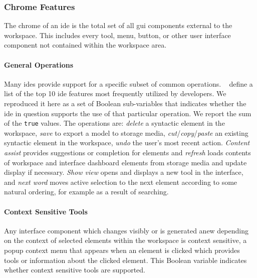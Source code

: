 \subsubsection{Chrome Features} \label{subsubsec:chrome}

The chrome of an \ac{ide} is the total set of all \acf{gui} components
external to the workspace. This includes every tool, menu, button, or other
user interface component not contained within the workspace area.


\paragraph{General Operations}
Many \acp{ide} provide support for a specific subset of common operations.
\citeauthor{murphy2006}~\cite{murphy2006} define a list of the top 10 \ac{ide} features most frequently utilized by developers.
We reproduced it here as a set of Boolean sub-variables that indicates whether the \ac{ide} in question supports the use of that particular operation.
We report the sum of the \texttt{true} values.
The operations are: \emph{delete} a syntactic element in the workspace,
\emph{save} to export a model to storage media,
\emph{cut}/\emph{copy}/\emph{paste} an existing syntactic element in the workspace,
\emph{undo} the user's most recent action.
\emph{Content assist} provides suggestions or completion for elements
and
\emph{refresh} loads contents of workspace and interface dashboard elements from storage media and update display if necessary.
\emph{Show view} opens and displays a new tool in the interface,
and
\emph{next word} moves active selection to the next element according to some natural ordering, for example as a result of searching.


\paragraph{Context Sensitive Tools}
Any interface component which changes visibly or is generated anew
depending on the context of selected elements within the workspace is
context sensitive, \eg a popup context menu that appears when an element is
clicked which provides tools or information about the clicked element.
This Boolean variable indicates whether context sensitive tools are
supported.


